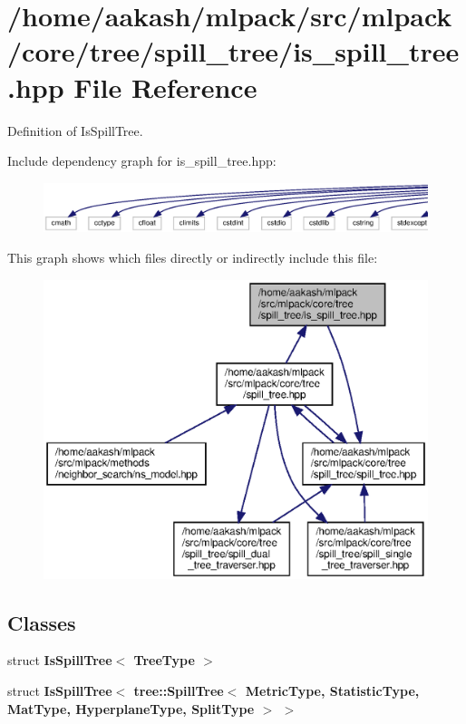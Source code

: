 \section{/home/aakash/mlpack/src/mlpack/core/tree/spill\+\_\+tree/is\+\_\+spill\+\_\+tree.hpp File Reference}
\label{is__spill__tree_8hpp}


Definition of Is\+Spill\+Tree.  


Include dependency graph for is\+\_\+spill\+\_\+tree.\+hpp\+:
\nopagebreak
\begin{figure}[H]
\begin{center}
\leavevmode
\includegraphics[width=350pt]{is__spill__tree_8hpp__incl}
\end{center}
\end{figure}
This graph shows which files directly or indirectly include this file\+:
\nopagebreak
\begin{figure}[H]
\begin{center}
\leavevmode
\includegraphics[width=350pt]{is__spill__tree_8hpp__dep__incl}
\end{center}
\end{figure}
\subsection*{Classes}
\begin{DoxyCompactItemize}
\item 
struct \textbf{ Is\+Spill\+Tree$<$ Tree\+Type $>$}
\item 
struct \textbf{ Is\+Spill\+Tree$<$ tree\+::\+Spill\+Tree$<$ Metric\+Type, Statistic\+Type, Mat\+Type, Hyperplane\+Type, Split\+Type $>$ $>$}
\end{DoxyCompactItemize}
